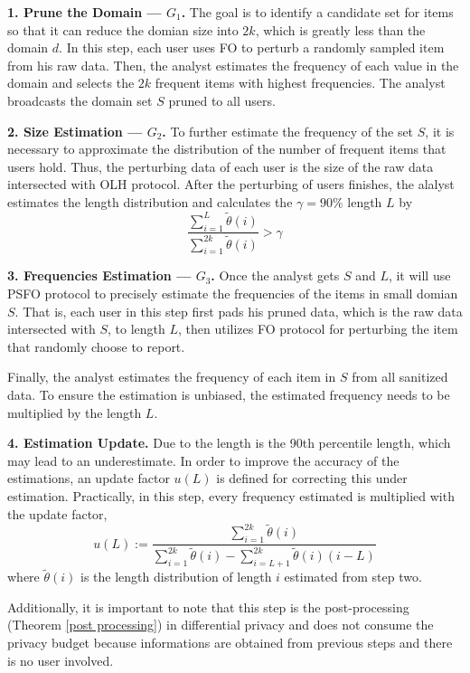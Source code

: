 \documentclass[conference]{IEEEtran}
\begin{document}
\textbf{1. Prune the Domain --- $G_1$.} The goal is to identify a candidate set for items so that it can reduce the domian size into $2k$, which is greatly less than the domain $d$. In this step, each user uses FO to perturb a randomly sampled item from his raw data. Then, the analyst estimates the frequency of each value in the domain and selects the $2k$ frequent items with highest frequencies. The analyst broadcasts the domain set $S$ pruned to all users.

\textbf{2. Size Estimation --- $G_2$.} To further estimate the frequency of the set $S$, it is necessary to approximate the distribution of the number of frequent items that users hold. Thus, the perturbing data of each user is the size of the raw data intersected with OLH protocol. After the perturbing of users finishes, the alalyst estimates the length distribution and calculates the $\gamma = 90\%$ length $L$ by  
\begin{equation}
\frac{\sum_{i=1}^{L} \tilde{\theta}(i)}{\sum_{i=1}^{2k} \tilde{\theta}(i)} > \gamma \label{length}
\end{equation}

\textbf{3. Frequencies Estimation --- $G_3$.} Once the analyst gets $S$ and $L$, it will use PSFO protocol to precisely estimate the frequencies of the items in small domian $S$. That is, each user in this step first pads his pruned data, which is the raw data intersected with $S$, to length $L$, then
utilizes FO protocol for perturbing the item that randomly choose to report. 

Finally, the analyst estimates the frequency of each item in $S$ from all sanitized data. To ensure the estimation is unbiased, the estimated frequency needs to be multiplied by the length $L$.

\textbf{4. Estimation Update.} Due to the length is the 90th percentile length, which may lead to an underestimate. In order to improve the accuracy of the estimations, an update factor $u(L)$ is defined for correcting this under estimation. Practically, in this step, every frequency estimated is multiplied with the update factor,
$$u(L) := \frac{\sum_{i=1}^{2k} \tilde{\theta}(i)}{\sum_{i=1}^{2k} \tilde{\theta}(i) - \sum_{i=L+1}^{2k} \tilde{\theta}(i)(i-L) }$$
where $\tilde{\theta}(i)$ is the length distribution of length $i$ estimated from step two.

Additionally, it is important to note that this step is the post-processing (Theorem \ref{post processing}) in differential privacy and does not consume the privacy budget because informations are obtained from previous steps and there is no user involved. 
\end{document}
